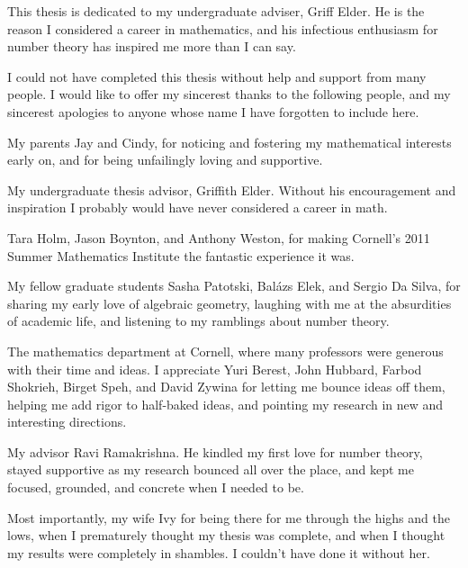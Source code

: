 \documentclass[phd,tocprelim]{cornell}
\begin{document}
\begin{dedication}
This thesis is dedicated to my undergraduate adviser, Griff Elder. He is the 
reason I considered a career in mathematics, and his infectious enthusiasm 
for number theory has inspired me more than I can say. 
\end{dedication}





\begin{acknowledgements}
I could not have completed this thesis without help and support from many 
people. I would like to offer my sincerest thanks to the following people, and 
my sincerest apologies to anyone whose name I have forgotten to include here. 

My parents Jay and Cindy, for noticing and fostering my mathematical 
interests early on, and for being unfailingly loving and supportive. 

My undergraduate thesis advisor, Griffith Elder. Without his encouragement 
and inspiration I probably would have never considered a career in math. 

Tara Holm, Jason Boynton, and Anthony Weston, for making Cornell's 2011 Summer 
Mathematics Institute the fantastic experience it was. 

My fellow graduate students Sasha Patotski, Bal\'azs Elek, and Sergio Da 
Silva, for sharing my early love of algebraic geometry, laughing with me at the 
absurdities of academic life, and listening to my ramblings about number theory. 

The mathematics department at Cornell, where many professors were generous 
with their time and ideas. I appreciate Yuri Berest, John Hubbard, Farbod 
Shokrieh, Birget Speh, and David Zywina for letting me bounce ideas off them, 
helping me add rigor to half-baked ideas, and pointing my research in new and 
interesting directions. 

My advisor Ravi Ramakrishna. He kindled my first love for number theory, 
stayed supportive as my research bounced all over the place, and kept me 
focused, grounded, and concrete when I needed to be. 

Most importantly, my wife Ivy for being there for me through the highs 
and the lows, when I prematurely thought my thesis was complete, and when I 
thought my results were completely in shambles. I couldn't have done it without 
her. 
\end{acknowledgements}
\end{document}
